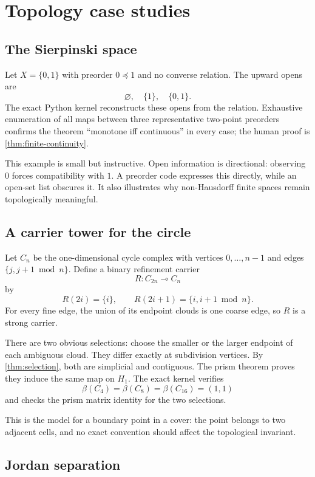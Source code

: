 
\section{Topology case studies}
\label{sec:cases}

\subsection{The Sierpinski space}

Let $X=\{0,1\}$ with preorder $0\preceq1$ and no converse relation.  The upward opens are
\[
  \varnothing,\quad\{1\},\quad\{0,1\}.
\]
The exact Python kernel reconstructs these opens from the relation.  Exhaustive enumeration of all maps between three representative two-point preorders confirms the theorem ``monotone iff continuous'' in every case; the human proof is \cref{thm:finite-continuity}.

This example is small but instructive.  Open information is directional: observing $0$ forces compatibility with $1$.  A preorder code expresses this directly, while an open-set list obscures it.  It also illustrates why non-Hausdorff finite spaces remain topologically meaningful.

\subsection{A carrier tower for the circle}

Let $C_n$ be the one-dimensional cycle complex with vertices $0,\ldots,n-1$ and edges $\{j,j+1\bmod n\}$.  Define a binary refinement carrier
\[
  R:C_{2n}\multimap C_n
\]
by
\[
  R(2i)=\{i\},
  \qquad
  R(2i+1)=\{i,i+1\bmod n\}.
\]
For every fine edge, the union of its endpoint clouds is one coarse edge, so $R$ is a strong carrier.

There are two obvious selections: choose the smaller or the larger endpoint of each ambiguous cloud.  They differ exactly at subdivision vertices.  By \cref{thm:selection}, both are simplicial and contiguous.  The prism theorem proves they induce the same map on $H_1$.  The exact kernel verifies
\[
  \beta(C_4)=\beta(C_8)=\beta(C_{16})=(1,1)
\]
and checks the prism matrix identity for the two selections.

This is the model for a boundary point in a cover: the point belongs to two adjacent cells, and no exact convention should affect the topological invariant.

\subsection{Jordan separation}

